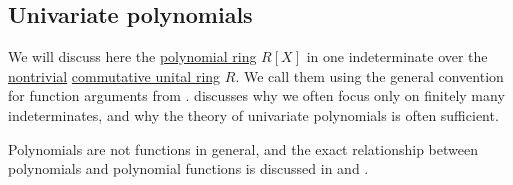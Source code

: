\subsection{Univariate polynomials}\label{subsec:univariate_polynomials}

We will discuss here the \hyperref[def:polynomial_algebra]{polynomial ring} \( R[X] \) in one indeterminate over the \hyperref[def:ring/trivial]{nontrivial} \hyperref[def:ring/commutative]{commutative unital ring} \( R \). We call them  using the general convention for function arguments from .  discusses why we often focus only on finitely many indeterminates, and why the theory of univariate polynomials is often sufficient.

Polynomials are not functions in general, and the exact relationship between polynomials and polynomial functions is discussed in  and .

